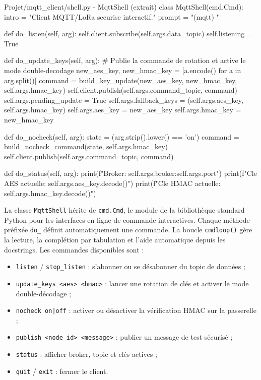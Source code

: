 \documentclass[a4paper,11pt]{report}
\begin{document}
\begin{pycode}{Projet/mqtt\_client/shell.py - MqttShell (extrait)}
class MqttShell(cmd.Cmd):
    intro = "Client MQTT/LoRa securise interactif."
    prompt = "(mqtt) "

    def do_listen(self, arg):
        self.client.subscribe(self.args.data_topic)
        self.listening = True

    def do_update_keys(self, arg):
        # Publie la commande de rotation et active le mode double-decodage
        new_aes_key, new_hmac_key = [a.encode() for a in arg.split()]
        command = build_key_update(new_aes_key, new_hmac_key, self.args.hmac_key)
        self.client.publish(self.args.command_topic, command)
        self.args.pending_update = True
        self.args.fallback_keys = (self.args.aes_key, self.args.hmac_key)
        self.args.aes_key = new_aes_key
        self.args.hmac_key = new_hmac_key

    def do_nocheck(self, arg):
        state = (arg.strip().lower() == 'on')
        command = build_nocheck_command(state, self.args.hmac_key)
        self.client.publish(self.args.command_topic, command)

    def do_status(self, arg):
        print(f"Broker: {self.args.broker}:{self.args.port}")
        print(f"Cle AES actuelle: {self.args.aes_key.decode()}")
        print(f"Cle HMAC actuelle: {self.args.hmac_key.decode()}")
\end{pycode}

La classe \texttt{MqttShell} hérite de \texttt{cmd.Cmd}, le module de la bibliothèque standard Python
pour les interfaces en ligne de commande interactives. Chaque méthode préfixée \texttt{do\_} définit
automatiquement une commande. La boucle \texttt{cmdloop()} gère la lecture, la complétion par tabulation
et l'aide automatique depuis les docstrings. Les commandes disponibles sont :

\begin{itemize}
    \item \texttt{listen} / \texttt{stop\_listen} : s'abonner ou se désabonner du topic de données ;
    \item \texttt{update\_keys <aes> <hmac>} : lancer une rotation de clés et activer le mode double-décodage ;
    \item \texttt{nocheck on|off} : activer ou désactiver la vérification HMAC sur la passerelle ;
    \item \texttt{publish <node\_id> <message>} : publier un message de test sécurisé ;
    \item \texttt{status} : afficher broker, topic et clés actives ;
    \item \texttt{quit} / \texttt{exit} : fermer le client.
\end{itemize}
\end{document}
